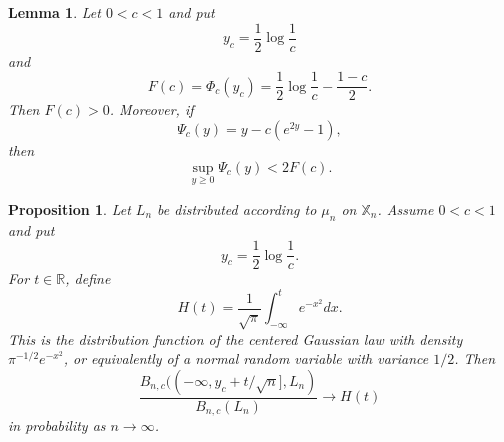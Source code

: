 \documentclass[10pt,a4paper]{amsart}
\newtheorem{prop}{Proposition}
\newtheorem{lem}{Lemma}
\newcommand{\re}{\mathbb R}
\begin{document}
\begin{lem}
\label{lem:laplace}
Let $0<c<1$ and put
$$
y_c=\frac{1}{2}\log\frac{1}{c}
$$
and
$$
F(c)=\Phi_c(y_c)=
\frac{1}{2}\log\frac{1}{c}-\frac{1-c}{2}.
$$
Then $F(c)>0$.
Moreover, if
$$
\Psi_c(y)=y-c(e^{2y}-1),
$$
then
$$
\sup_{y\ge0}\Psi_c(y)<2F(c).
$$
\end{lem}

\begin{prop}
\label{prop:local-critical-thermal-mass}
Let $L_n$ be distributed according to $\mu_n$ on $\mathbb X_n$.
Assume $0<c<1$ and put
$$
y_c=\frac{1}{2}\log\frac{1}{c}.
$$
For $t\in\re$, define
$$
H(t)=\frac{1}{\sqrt{\pi}}\int_{-\infty}^{t}e^{-x^2}dx.
$$
This is the distribution function of the centered Gaussian law with density
$\pi^{-1/2}e^{-x^2}$, or equivalently of a normal random variable with
variance $1/2$.
Then
$$
\frac{
B_{n,c}((-\infty,y_c+t/\sqrt{n}],L_n)
}{
B_{n,c}(L_n)
}
\longrightarrow H(t)
$$
in probability as $n\to\infty$.
\end{prop}
\end{document}
